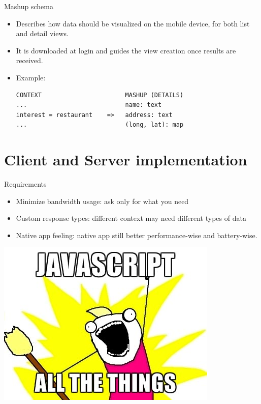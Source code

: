 \documentclass[smaller]{beamer}
\begin{document}
\begin{frame}[fragile,label={sec:orgheadline16}]{Mashup schema}
 \begin{itemize}
\item Describes how data should be visualized on the mobile device, for both \alert{list}
  and \alert{detail} views.

\item It is downloaded at login and guides the view creation once results are
received.

\item Example:

\begin{verbatim}
CONTEXT                       MASHUP (DETAILS)
...                           name: text
interest = restaurant    =>   address: text
...                           (long, lat): map
\end{verbatim}
\end{itemize}
\end{frame}

\section{Client and Server implementation}
\label{sec:orgheadline24}
\begin{frame}[label={sec:orgheadline18}]{Requirements}
\begin{itemize}
\item \alert{Minimize bandwidth usage}: ask only for what you need

\item \alert{Custom response types}: different context may need different types of data

\item \alert{Native app feeling}: native app still better performance-wise and battery-wise.
\end{itemize}
\end{frame}

\begin{frame}[label={sec:orgheadline19}]{}
\includegraphics[width=.9\linewidth]{./images/jsatt.jpg} 
\end{frame}
\end{document}
